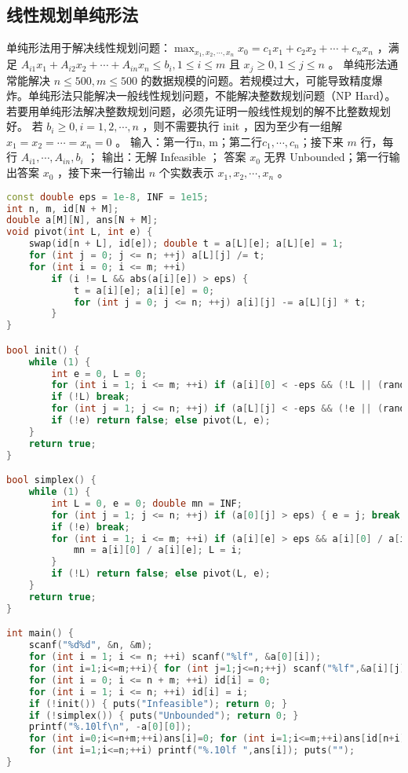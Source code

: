 \documentclass[landscape,a4paper]{article}
\begin{document}
\subsection{线性规划单纯形法}

单纯形法用于解决线性规划问题：$\max_{x_1, x_2, \cdots, x_n} x_0 = c_1x_1 + c_2x_2 + \cdots + c_nx_n$ ，满足 $A_{i1}x_1 + A_{i2}x_2 + \cdots + A_{in}x_n \leq b_i, 1 \leq i \leq m$ 且 $x_j \geq 0, 1 \leq j \leq n$ 。
单纯形法通常能解决 $n \leq 500, m \leq 500$ 的数据规模的问题。若规模过大，可能导致精度爆炸。单纯形法只能解决一般线性规划问题，不能解决整数规划问题（NP Hard）。若要用单纯形法解决整数规划问题，必须先证明一般线性规划的解不比整数规划好。
 若 $b_i \geq 0, i = 1, 2, \cdots, n$ ，则不需要执行 init ，因为至少有一组解 $x_1 = x_2 = \cdots = x_n = 0$ 。
 输入：第一行n, m；第二行$c_1, \cdots, c_n$；接下来 $m$ 行，每行 $A_{i1}, \cdots, A_{in}, b_i$ ；
输出：无解 Infeasible ； 答案 $x_0$ 无界 Unbounded；第一行输出答案 $x_0$ ，接下来一行输出 $n$ 个实数表示 $x_1, x_2, \cdots , x_n$ 。

\begin{lstlisting}[language=C++]
const double eps = 1e-8, INF = 1e15;
int n, m, id[N + M];
double a[M][N], ans[N + M];
void pivot(int L, int e) {
	swap(id[n + L], id[e]); double t = a[L][e]; a[L][e] = 1;
	for (int j = 0; j <= n; ++j) a[L][j] /= t;
	for (int i = 0; i <= m; ++i)
		if (i != L && abs(a[i][e]) > eps) {
			t = a[i][e]; a[i][e] = 0;
			for (int j = 0; j <= n; ++j) a[i][j] -= a[L][j] * t;
		}
}

bool init() {
	while (1) {
		int e = 0, L = 0;
		for (int i = 1; i <= m; ++i) if (a[i][0] < -eps && (!L || (rand() & 1))) L = i;
		if (!L) break;
		for (int j = 1; j <= n; ++j) if (a[L][j] < -eps && (!e || (rand() & 1))) e = j;
		if (!e) return false; else pivot(L, e);
	}
	return true;
}

bool simplex() {
	while (1) {
		int L = 0, e = 0; double mn = INF;
		for (int j = 1; j <= n; ++j) if (a[0][j] > eps) { e = j; break; }
		if (!e) break;
		for (int i = 1; i <= m; ++i) if (a[i][e] > eps && a[i][0] / a[i][e] < mn) {
			mn = a[i][0] / a[i][e]; L = i;
		}
		if (!L) return false; else pivot(L, e);
	}
	return true;
}

int main() {
	scanf("%d%d", &n, &m);
	for (int i = 1; i <= n; ++i) scanf("%lf", &a[0][i]);
	for (int i=1;i<=m;++i){ for (int j=1;j<=n;++j) scanf("%lf",&a[i][j]); scanf("%lf",&a[i][0]); }
	for (int i = 0; i <= n + m; ++i) id[i] = 0;
	for (int i = 1; i <= n; ++i) id[i] = i;
	if (!init()) { puts("Infeasible"); return 0; }
	if (!simplex()) { puts("Unbounded"); return 0; }
	printf("%.10lf\n", -a[0][0]);
	for (int i=0;i<=n+m;++i)ans[i]=0; for (int i=1;i<=m;++i)ans[id[n+i]]=a[i][0];
	for (int i=1;i<=n;++i) printf("%.10lf ",ans[i]); puts("");
}
\end{lstlisting}
\end{document}
